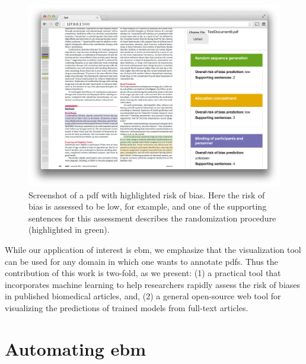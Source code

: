 \documentclass[runningheads,a4paper]{llncs}
\begin{document}
\begin{figure}[htb]
\vspace{-2em}
\centering
\includegraphics[width=0.8\linewidth]{./images/screenshot2.png}
\vspace{-1em}
\caption{\label{fig:screenshot}Screenshot of a \ac{pdf} with highlighted risk of bias. Here the risk of bias is assessed to be low, for example, and one of the supporting sentences for this assessment describes the randomization procedure (highlighted in green).}
\vspace{-1.5em}
\end{figure}

While our application of interest is \ac{ebm}, we emphasize that the visualization tool can be used for any domain in which one wants to annotate \acp{pdf}.
Thus the contribution of this work is two-fold, as we present:
(1) a practical tool that incorporates machine learning to help researchers rapidly assess the risk of biases in published biomedical articles, and,
(2) a general open-source web tool for visualizing the predictions of trained models from full-text articles.

\section{Automating \acl{ebm}}
\label{section:EBM-ML}
\end{document}
